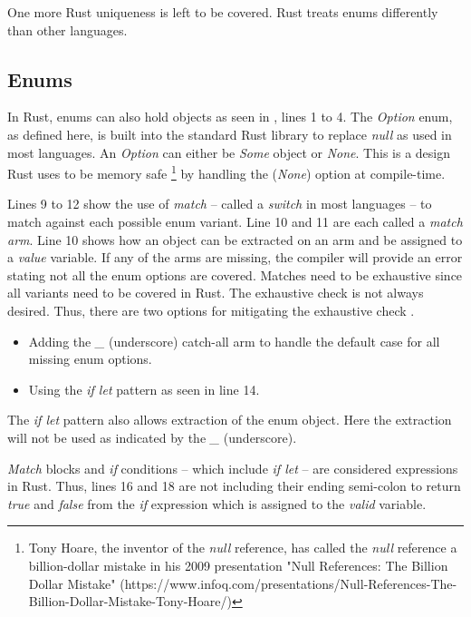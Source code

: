 One more Rust uniqueness is left to be covered. Rust treats enums differently than other languages.

\subsection{Enums}
In Rust, enums can also hold objects \cite{klabnik_2019_01} as seen in , lines 1 to 4.
The \textit{Option} enum, as defined here, is built into the standard Rust library \cite{klabnik_2019_01} to replace \textit{null} as used in most languages.
An \textit{Option} can either be \textit{Some} object or \textit{None}.
This is a design Rust uses to be memory safe \footnote{Tony Hoare, the inventor of the \textit{null} reference, has called the \textit{null} reference a billion-dollar mistake in his 2009 presentation "Null References: The Billion Dollar Mistake" (https://www.infoq.com/presentations/Null-References-The-Billion-Dollar-Mistake-Tony-Hoare/)} by handling the (\textit{None}) option at compile-time.


Lines 9 to 12 show the use of \textit{match} -- called a \textit{switch} in most languages -- to match against each possible enum variant.
Line 10 and 11 are each called a \textit{match arm}.
Line 10 shows how an object can be extracted on an arm and be assigned to a \textit{value} variable.
If any of the arms are missing, the compiler will provide an error stating not all the enum options are covered.
Matches need to be exhaustive since all variants need to be covered in Rust.
The exhaustive check is not always desired.
Thus, there are two options for mitigating the exhaustive check \cite{klabnik_2019_01}.

\begin{itemize}
	\item Adding the \textit{\_} (underscore) catch-all arm to handle the default case for all missing enum options.
	\item Using the \textit{if let} pattern as seen in line 14.
\end{itemize}

The \textit{if let} pattern also allows extraction of the enum object.
Here the extraction will not be used as indicated by the \textit{\_} (underscore).

\textit{Match} blocks and \textit{if} conditions -- which include \textit{if let} -- are considered expressions in Rust.
Thus, lines 16 and 18 are not including their ending semi-colon to return \textit{true} and \textit{false} from the \textit{if} expression which is assigned to the \textit{valid} variable.

